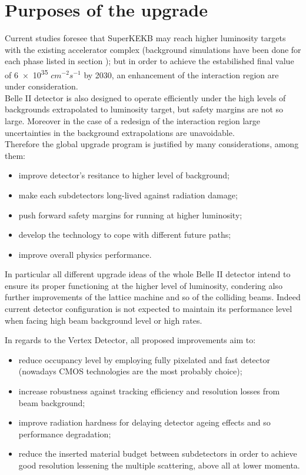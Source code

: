 \section{Purposes of the upgrade}

Current studies foresee that SuperKEKB may reach higher luminosity targets with the existing accelerator complex (background simulations have been done for each phase listed in section ); but in order to achieve the estabilished final value of  \num{6e35} $cm^{-2} s^{-1}$ by 2030, an enhancement of the interaction region are under consideration.\\

Belle II detector is also designed to operate efficiently under the high levels of backgrounds extrapolated to luminosity target, but safety margins are not so large. Moreover in the case of a redesign of the interaction region large uncertainties in the background extrapolations are unavoidable. \\
Therefore the global upgrade program is justified by many considerations, among them:

\begin{itemize}
\item improve detector's resitance to higher level of background;
\item make each subdetectors long-lived against radiation damage;
\item push forward safety margins for running at higher luminosity;
\item develop the technology to cope with different future paths;
\item improve overall physics performance.
\end{itemize}


In particular all different upgrade ideas of the whole Belle II detector intend to ensure its proper functioning at the higher level of luminosity, condering also further improvements of the lattice machine and so of the colliding beams. Indeed current detector configuration is not expected to maintain its performance level when facing high beam background level or high rates.

In regards to the Vertex Detector, all proposed improvements aim to:

\begin{itemize}
\item reduce occupancy level by employing fully pixelated and fast detector (nowadays CMOS technologies are the most probably choice);
\item increase robustness against tracking efficiency and resolution losses from beam background;
\item improve radiation hardness for delaying detector ageing effects and so performance degradation;
\item reduce the inserted material budget between subdetectors in order to achieve good resolution lessening the multiple scattering, above all at lower momenta.
\end{itemize}



